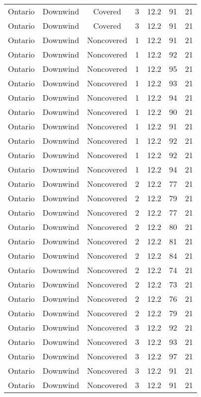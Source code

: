 \documentclass{article}
\begin{document}
\begin{longtable}[H]{ccccccc}
Ontario & Downwind & Covered     & 3 & 12.2 & 91  & 21 \\
Ontario & Downwind & Covered     & 3 & 12.2 & 91  & 21 \\
Ontario & Downwind & Noncovered & 1 & 12.2 & 91  & 21 \\
Ontario & Downwind & Noncovered & 1 & 12.2 & 92  & 21 \\
Ontario & Downwind & Noncovered & 1 & 12.2 & 95  & 21 \\
Ontario & Downwind & Noncovered & 1 & 12.2 & 93  & 21 \\
Ontario & Downwind & Noncovered & 1 & 12.2 & 94  & 21 \\
Ontario & Downwind & Noncovered & 1 & 12.2 & 90  & 21 \\
Ontario & Downwind & Noncovered & 1 & 12.2 & 91  & 21 \\
Ontario & Downwind & Noncovered & 1 & 12.2 & 92  & 21 \\
Ontario & Downwind & Noncovered & 1 & 12.2 & 92  & 21 \\
Ontario & Downwind & Noncovered & 1 & 12.2 & 94  & 21 \\
Ontario & Downwind & Noncovered & 2 & 12.2 & 77  & 21 \\
Ontario & Downwind & Noncovered & 2 & 12.2 & 79  & 21 \\
Ontario & Downwind & Noncovered & 2 & 12.2 & 77  & 21 \\
Ontario & Downwind & Noncovered & 2 & 12.2 & 80  & 21 \\
Ontario & Downwind & Noncovered & 2 & 12.2 & 81  & 21 \\
Ontario & Downwind & Noncovered & 2 & 12.2 & 84  & 21 \\
Ontario & Downwind & Noncovered & 2 & 12.2 & 74  & 21 \\
Ontario & Downwind & Noncovered & 2 & 12.2 & 73  & 21 \\
Ontario & Downwind & Noncovered & 2 & 12.2 & 76  & 21 \\
Ontario & Downwind & Noncovered & 2 & 12.2 & 79  & 21 \\
Ontario & Downwind & Noncovered & 3 & 12.2 & 92  & 21 \\
Ontario & Downwind & Noncovered & 3 & 12.2 & 93  & 21 \\
Ontario & Downwind & Noncovered & 3 & 12.2 & 97  & 21 \\
Ontario & Downwind & Noncovered & 3 & 12.2 & 91  & 21 \\
Ontario & Downwind & Noncovered & 3 & 12.2 & 91  & 21 \\

\end{longtable}
\end{document}
